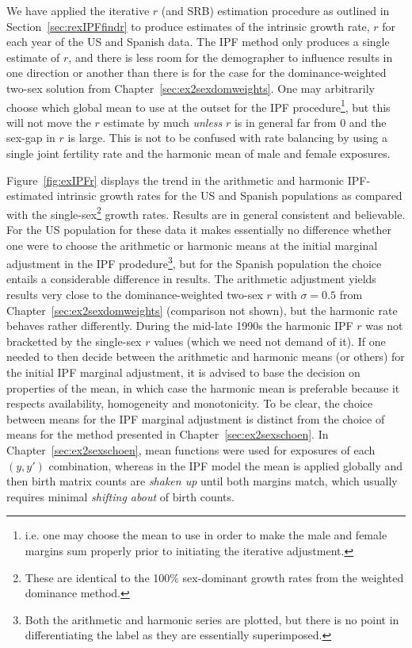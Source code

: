 \FloatBarrier

We have applied the iterative $r$ (and SRB) estimation procedure as outlined in
Section~\ref{sec:rexIPFfindr} to produce estimates of the intrinsic growth rate,
$r$ for each year of the US and Spanish data. The IPF method only produces a
single estimate of $r$, and there is less room for the demographer to influence
results in one direction or another than there is for the case for the
dominance-weighted two-sex solution from Chapter~\ref{sec:ex2sexdomweights}. One may
arbitrarily choose which global mean to use at the outset for the IPF
procedure\footnote{i.e. one may choose the mean to use in order to make the male
and female margins sum properly prior to initiating the iterative adjustment.},
but this will not move the $r$ estimate by much \textit{unless} $r$ is in
general far from 0 and the sex-gap in $r$ is large. This is not to be confused
with rate balancing by using a single joint fertility rate and the harmonic 
mean of male and female exposures.

Figure~\ref{fig:exIPFr} displays the trend in the arithmetic and harmonic
IPF-estimated intrinsic growth rates for the US and Spanish populations as
compared with the single-sex\footnote{These are identical to the
100\% sex-dominant growth rates from the weighted dominance method.} growth
rates. Results are in general consistent and believable. For the US population 
for these data it makes essentially no difference whether one were to choose the
 arithmetic or harmonic means at the initial marginal adjustment in the IPF 
 prodedure\footnote{Both the arithmetic
and harmonic series are plotted, but there is no point in differentiating the
label as they are essentially superimposed.}, but for the Spanish population the
choice entails a considerable difference in results. The arithmetic
adjustment yields results very close to the dominance-weighted two-sex $r$ with
$\sigma = 0.5$ from Chapter~\ref{sec:ex2sexdomweights} (comparison not shown),
but the harmonic rate behaves rather differently. During the mid-late 1990s the
harmonic IPF $r$ was not bracketted by the single-sex $r$ values (which we
need not demand of it). If one needed to then decide between the arithmetic and
harmonic means (or others) for the initial IPF marginal adjustment, it is
advised to base the decision on properties of the mean, in which case the
harmonic mean is preferable because it respects availability, homogeneity and
monotonicity. To be clear, the choice between means for the IPF marginal
adjustment is distinct from the choice of means for the method presented in
Chapter~\ref{sec:ex2sexschoen}. In Chapter~\ref{sec:ex2sexschoen}, mean
functions were used for exposures of each $(y,y')$ combination, whereas in the
IPF model the mean is applied globally and then birth matrix counts are \textit{shaken up}
until both margins match, which usually requires minimal \textit{shifting about}
of birth counts.

